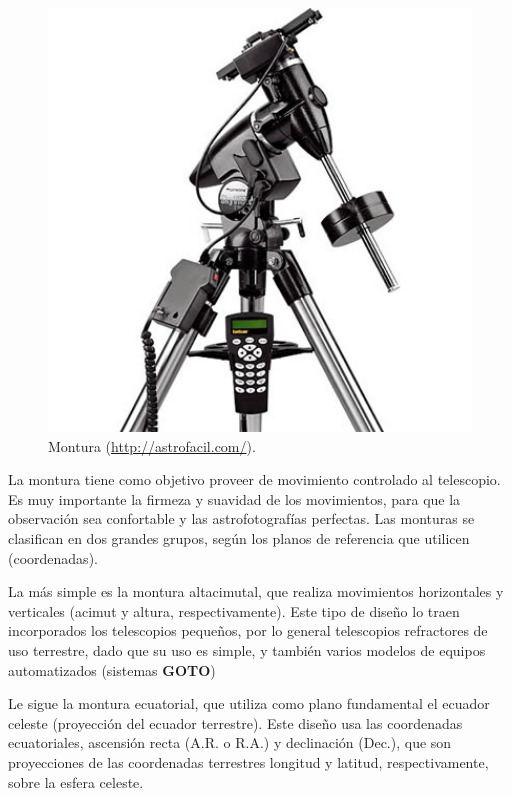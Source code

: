 \bigskip
\begin{figure}[!ht]
  \begin{center}
  \includegraphics[width=1\textwidth]{../images/montura.jpg}
  \caption{Montura (\url{http://astrofacil.com/}).}
  \label{fig:diag_scrum}
  \end{center}
\end{figure}

\bigskip
La montura tiene como objetivo proveer de movimiento controlado al telescopio. Es muy importante la firmeza y suavidad de los movimientos, para que la observación sea confortable y las astrofotografías perfectas. Las monturas se clasifican en dos grandes grupos, según los planos de referencia que utilicen (coordenadas).

\bigskip
La más simple es la montura altacimutal, que realiza movimientos horizontales y verticales (acimut y altura, respectivamente). Este tipo de diseño lo traen incorporados los telescopios pequeños, por lo general telescopios refractores de uso terrestre, dado que su uso es simple, y también varios modelos de equipos automatizados (sistemas \textbf{GOTO})

\bigskip
Le sigue la montura ecuatorial, que utiliza como plano fundamental el ecuador celeste (proyección del ecuador terrestre). Este diseño usa las coordenadas ecuatoriales, ascensión recta (A.R. o R.A.) y declinación (Dec.), que son proyecciones de las coordenadas terrestres longitud y latitud, respectivamente, sobre la esfera celeste.

